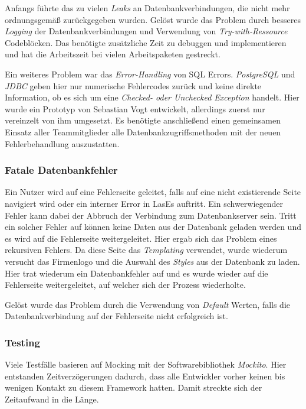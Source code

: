 Anfangs führte das zu vielen \emph{Leaks} an Datenbankverbindungen, die nicht mehr ordnungsgemäß zurückgegeben wurden. Gelöst wurde das Problem durch besseres \emph{Logging} der Datenbankverbindungen und Verwendung von \emph{Try-with-Ressource} Codeblöcken. Das benötigte zusätzliche Zeit zu debuggen und implementieren und hat die Arbeitszeit bei vielen Arbeitspaketen gestreckt.\newline

Ein weiteres Problem war das \emph{Error-Handling} von SQL Errors. \emph{PostgreSQL} und \emph{JDBC} geben hier nur numerische Fehlercodes zurück und keine direkte Information, ob es sich um eine \emph{Checked- oder Unchecked Exception} handelt. Hier wurde ein Prototyp von Sebastian Vogt entwickelt, allerdings zuerst nur vereinzelt von ihm umgesetzt. Es benötigte anschließend einen gemeinsamen Einsatz aller Teammitglieder alle Datenbankzugriffsmethoden mit der neuen Fehlerbehandlung auszustatten.

\subsubsection{Fatale Datenbankfehler}

Ein Nutzer wird auf eine Fehlerseite geleitet, falls auf eine nicht existierende Seite navigiert wird oder ein interner Error in LasEs auftritt.
Ein schwerwiegender Fehler kann dabei der Abbruch der Verbindung zum Datenbankserver sein.
Tritt ein solcher Fehler auf können keine Daten aus der Datenbank geladen werden und es wird auf die Fehlerseite weitergeleitet. Hier ergab sich das Problem eines rekursiven Fehlers.\newline
Da diese Seite das \emph{Templating} verwendet, wurde wiederum versucht das Firmenlogo und die Auswahl des \emph{Styles}  aus der Datenbank zu laden. Hier trat wiederum ein Datenbankfehler auf und es wurde wieder auf die Fehlerseite weitergeleitet, auf welcher sich der Prozess wiederholte.

Gelöst wurde das Problem durch die Verwendung von \emph{Default} Werten, falls die Datenbankverbindung auf der Fehlerseite nicht erfolgreich ist.

\subsubsection{Testing}

Viele Testfälle basieren auf Mocking mit der Softwarebibliothek \emph{Mockito}. Hier entstanden Zeitverzögerungen dadurch, dass alle Entwickler vorher keinen bis wenigen Kontakt zu diesem Framework hatten. Damit streckte sich der Zeitaufwand in die Länge.


